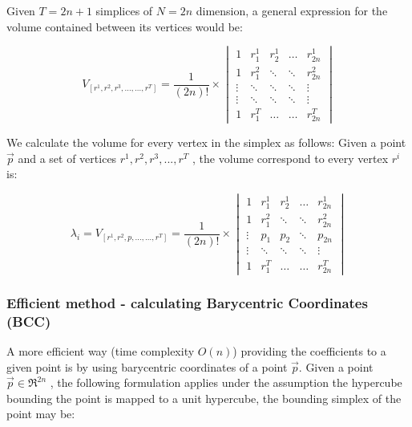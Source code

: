 		Given $T = 2n+1$ simplices of $N = 2n$ dimension, a general expression for the volume contained between its vertices would be:
		
	
		\begin{equation}
		V_{[r^1,r^2,r^3,\dots,\dots,r^T]} = \frac{1}{(2n)!} \times \begin{vmatrix}
		1 & r_1^1 & r_2^1 & \dots & r_{2n}^1\\ 
		1 & r_1^2 & \ddots & \ddots & r_{2n}^2\\ 
		\vdots & \ddots & \ddots & \ddots & \vdots \\ 
		\vdots & \ddots & \ddots & \ddots & \vdots\\ 
		1 & r_{1}^T &  \dots& \dots & r_{2n}^T
		\end{vmatrix}
		\end{equation}
				
    	We calculate the volume for every vertex in the simplex as follows:
		Given a point $\overrightarrow{p}$ and a set of vertices $r^1,r^2,r^3,...,r^T$ ,  the volume correspond to every vertex $r^i$ is: 
		
		\begin{equation}
			\lambda_i = 	V_{[r^1,r^2,p,\dots,\dots,r^T]} = \frac{1}{(2n)!} \times \begin{vmatrix}
				1 & r_1^1 & r_2^1 & \dots & r_{2n}^1\\ 
				1 & r_1^2 & \ddots & \ddots & r_{2n}^2\\ 
				\vdots &  p_1  & p_2 & \ddots & p_{2n} \\ 
				\vdots & \ddots & \ddots & \ddots & \vdots\\ 
				1 & r_{1}^T &  \dots& \dots & r_{2n}^T
				\end{vmatrix}
		\end{equation}
			
		\subsubsection{Efficient method - calculating Barycentric Coordinates (BCC)}
		
		A more efficient way (time complexity $O(n)$) providing the coefficients to a given point is by using barycentric coordinates of a point $\overrightarrow{p}$.
		Given a point $\overrightarrow{p} \in \Re^{2n}$ , the following formulation applies under the assumption the hypercube bounding the point is mapped to a unit hypercube, the bounding simplex of the point may be: \\ \\ 
		
